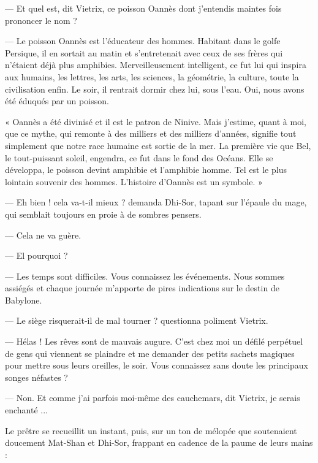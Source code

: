 \documentclass[a4paper, 11pt, oneside, polutonikogreek, french]{article}
\begin{document}
\bigskip
\centerline{\EightStarTaper}
\centerline{\EightStarTaper\EightStarTaper}
\bigskip

--- Et quel est, dit Vietrix, ce poisson Oannès dont j'entendis maintes fois prononcer le nom ?

--- Le poisson Oannès est l'éducateur des hommes. Habitant dans le golfe Persique, il en sortait au matin et s'entretenait avec ceux de ses frères qui n'étaient déjà plus amphibies. Merveilleusement intelligent, ce fut lui qui inspira aux humains, les lettres, les arts, les sciences, la géométrie, la culture, toute la civilisation enfin. Le soir, il rentrait dormir chez lui, sous l'eau. Oui, nous avons été éduqués par un poisson.

« Oannès a été divinisé et il est le patron de Ninive. Mais j'estime, quant à moi, que ce mythe, qui remonte à des milliers et des milliers d'années, signifie tout simplement que notre race humaine est sortie de la mer. La première vie que Bel, le tout-puissant soleil, engendra, ce fut dans le fond des Océans. Elle se développa, le poisson devint amphibie et l'amphibie homme. Tel est le plus lointain souvenir des hommes. L'histoire d'Oannès est un symbole. »

\bigskip
\centerline{\EightStarTaper}
\centerline{\EightStarTaper\EightStarTaper}
\bigskip

--- Eh bien ! cela va-t-il mieux ? demanda Dhi-Sor, tapant sur l'épaule du mage, qui semblait toujours en proie à de sombres pensers.

--- Cela ne va guère.

--- El pourquoi ?

--- Les temps sont difficiles. Vous connaissez les événements. Nous sommes assiégés et chaque journée m'apporte de pires indications sur le destin de Babylone.

--- Le siège risquerait-il de mal tourner ? questionna poliment Vietrix.

--- Hélas ! Les rêves sont de mauvais augure. C'est chez moi un défilé perpétuel de gens qui viennent se plaindre et me demander des petits sachets magiques pour mettre sous leurs oreilles, le soir. Vous connaissez sans doute les principaux songes néfastes ?

--- Non. Et comme j'ai parfois moi-même des cauchemars, dit Vietrix, je serais enchanté ...

\bigskip
\centerline{\EightStarTaper}
\centerline{\EightStarTaper\EightStarTaper}
\bigskip
\clearpage
Le prêtre se recueillit un instant, puis, sur un ton de mélopée que soutenaient doucement Mat-Shan et Dhi-Sor, frappant en cadence de la paume de leurs mains :
\end{document}
